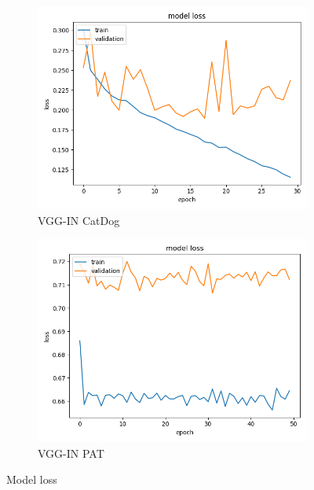 \begin{figure}
\begin{subfigure}[b]{.45\linewidth}
\includegraphics[width=\linewidth]{Figs/vgg_in_catdog_loss.jpg}
\caption{VGG-IN CatDog}
\end{subfigure}
\begin{subfigure}[b]{.45\linewidth}
\includegraphics[width=\linewidth]{Figs/vgg_pat_loss.jpg}
\caption{VGG-IN PAT}
\end{subfigure}
\caption{Model loss}
\label{fig:loss2}
\end{figure}

